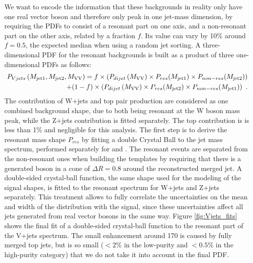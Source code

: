 We want to encode the information that these backgrounds in reality only have one real vector boson and therefore only peak in one jet-mass dimension, by requiring the PDFs to consist of a resonant part on one axis, and a non-resonant part on the other axis, related by a fraction $f$. Its value can vary by 10\% around $f=0.5$, the expected median when using a random jet sorting. A three-dimensional PDF for the resonant backgrounds is built as a product of three one-dimensional PDFs as follows:
\begin{equation}
\begin{split}
\label{eq:searchIII:vjetpdf}
P_{Vjets} \left(M_{\rm jet1}, M_{\rm jet2}, M_{\rm VV} \right) = f \times \left( P_{dijet} \left( M_{\rm VV} \right) \times P_{res} ( M_{\rm jet1} ) \times P_{non-res} (M_{\rm jet2} ) \right) \\ 
+ (1-f) \times \left( P_{dijet} \left( M_{\rm VV} \right) \times P_{res} ( M_{\rm jet2} ) \times P_{non-res} (M_{\rm jet1} ) \right)~.
\end{split}
\end{equation}
The contribution of W+jets and top pair production are considered as one combined background shape, due to both being resonant at the W boson mass peak, while the Z+jets contribution is fitted separately. The top contribution is is less than 1\% and negligible for this analysis. The first step is to derive the resonant mass shape $P_{res}$ by fitting a double Crystal Ball to the jet mass spectrum, performed separately for \MJO and \MJT. The resonant events are separated from the non-resonant ones when building the templates by requiring that there is a generated boson in a cone of $\Delta R = 0.8$ around the reconstructed merged jet.  A double-sided crystal-ball function, the same shape used for the modeling of the signal \MJ shapes, is fitted to the resonant spectrum for W+jets and Z+jets separately. This treatment allows to fully correlate the uncertainties on the mean and width of the \MJ distribution with the signal, since these uncertainties affect all jets generated from real vector bosons in the same way. Figure \ref{fig:Vjets_fits} shows the final fit of a double-sided crystal-ball function to the resonant part of the V+jets spectrum. The small enhancement around 170 \GeV is caused by fully merged top jets, but is so small ($<2\%$ in the low-purity and $<0.5\%$ in the high-purity category) that we do not take it into account in the final PDF.
